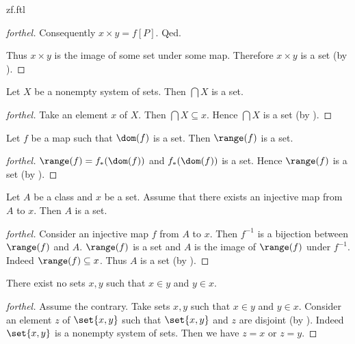 \documentclass{naproche-library}
\begin{document}
\begin{smodule}{zf.ftl}
\begin{proof}[forthel]
      Consequently $x \times y = f[P]$.
    Qed.

    Thus $x \times y$ is the image of some set under some map.
    Therefore $x \times y$ is a set (by ).
  \end{proof}

  \begin{proposition}[forthel,id=FOUNDATIONS_10_5486815207227392]
    Let $X$ be a nonempty system of sets.
    Then $\bigcap X$ is a set.
  \end{proposition}
  \begin{proof}[forthel]
    Take an element $x$ of $X$.
    Then $\bigcap X \subseteq x$.
    Hence $\bigcap X$ is a set (by ).
  \end{proof}

  \begin{proposition}[forthel,id=FOUNDATIONS_10_7598384349184000]
    Let $f$ be a map such that $\dom(f)$ is a set.
    Then $\range(f)$ is a set.
  \end{proposition}
  \begin{proof}[forthel]
    $\range(f) = f_{*}(\dom(f))$ and $f_{*}(\dom(f))$ is a set.
    Hence $\range(f)$ is a set (by ).
  \end{proof}

  \begin{proposition}[forthel,id=FOUNDATIONS_10_8631339572002816]
    Let $A$ be a class and $x$ be a set.
    Assume that there exists an injective map from $A$ to $x$.
    Then $A$ is a set.
  \end{proposition}
  \begin{proof}[forthel]
    Consider an injective map $f$ from $A$ to $x$.
    Then $f^{-1}$ is a bijection between $\range(f)$ and $A$.
    $\range(f)$ is a set and $A$ is the image of $\range(f)$ under $f^{-1}$.
    Indeed $\range(f) \subseteq x$.
    Thus $A$ is a set (by ).
  \end{proof}

  \begin{proposition}[forthel,id=FOUNDATIONS_10_8812282138066944]
    There exist no sets $x, y$ such that $x \in y$ and $y \in x$.
  \end{proposition}
  \begin{proof}[forthel]
    Assume the contrary.
    Take sets $x,y$ such that $x \in y$ and $y \in x$.
    Consider an element $z$ of $\set{x,y}$ such that $\set{x,y}$ and $z$ are disjoint (by ).
    Indeed $\set{x,y}$ is a nonempty system of sets.
    Then we have $z = x$ or $z = y$.


\end{proof}
\end{smodule}
\end{document}
